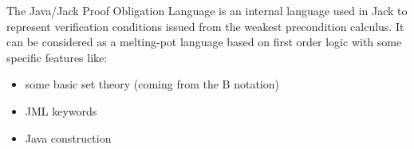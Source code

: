 \label{JPOL}
The Java/Jack Proof Obligation Language is an internal language used in Jack to represent verification conditions issued from the weakest precondition calculus. It can be considered as a melting-pot language based on first order logic with some specific features like:
\begin{itemize}
\item some basic set theory (coming from the B notation)
\item JML keywords
\item Java construction
\end{itemize}



